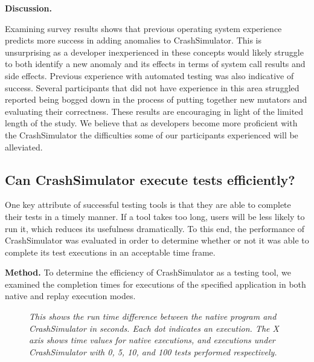 {\bf Discussion. }

Examining survey results
shows that previous operating system experience predicts more success in
adding anomalies to CrashSimulator.  This is unsurprising as a developer
inexperienced in these concepts would likely struggle to both identify
a new anomaly and its effects in terms of system call results and side
effects.
Previous experience with automated testing was also indicative of success.
Several participants that did not have experience in this area struggled
reported being bogged down in the process of putting together new mutators
and evaluating their correctness.  These results are encouraging in light
of the limited length of the study.  We believe that as developers become
more proficient with the CrashSimulator the difficulties some of our
participants experienced will be alleviated.

\subsection{Can CrashSimulator execute tests efficiently?}
\label{sec-perf}

One key attribute of successful testing tools is that they are able to
complete their tests in a timely manner.  If a tool takes too long,
users will be less likely to run it, which reduces its
usefulness dramatically. To this end, the performance of CrashSimulator was
evaluated in order to determine whether or not it was able to complete its
test executions in an acceptable time frame.

{\bf Method.} To determine the efficiency of CrashSimulator as a testing tool,
we examined the completion
times for executions of the specified application in both
native and replay execution modes.


    \begin{figure}[t]
        \center{}
        \caption{\emph{This shows the run time difference between the
native program and CrashSimulator in seconds.  Each dot indicates an
        execution.  The X axis shows time values for native executions, and
        executions under CrashSimulator with 0, 5, 10, and 100 tests
        performed respectively.
}}
         \label{figure:performance}

    \end{figure}


